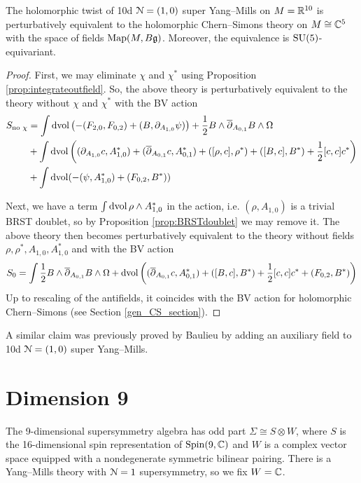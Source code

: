 \documentclass[10pt, oneside]{article}
\begin{document}
\begin{thm}
The holomorphic twist of 10d $\mathcal{N}=(1, 0)$ super Yang--Mills on $M=\mathbb R^{10}$ is perturbatively equivalent to the holomorphic Chern--Simons theory on $M\cong\mathbb C^5$ with the space of fields $\operatorname{Map}(M, B\mathfrak{g})$. Moreover, the equivalence is $\mathrm{SU}(5)$-equivariant.
\label{thm:10dholomorphictwist}
\end{thm}
\begin{proof}
First, we may eliminate $\chi$ and $\chi^*$ using Proposition \ref{prop:integrateoutfield}. So, the above theory is perturbatively equivalent to the theory without $\chi$ and $\chi^*$ with the BV action
\begin{align*}
S_{\text{no }\chi} &= \int \operatorname{dvol} \left(-(F_{2, 0}, F_{0, 2}) + (B, \partial_{A_{1, 0}} \psi)\right)  + \frac{1}{2}B\wedge \overline{\partial}_{A_{0, 1}} B\wedge\Omega \\
&+ \int \operatorname{dvol}\left((\partial_{A_{1, 0}} c, A_{1, 0}^*) + (\overline{\partial}_{A_{0, 1}} c, A_{0, 1}^*) + ([\rho, c], \rho^*) + ([B, c], B^*) + \frac{1}{2}[c, c]c^*\right) \\
&+ \int \operatorname{dvol}(-(\psi, A_{1, 0}^*) + (F_{0, 2}, B^*))
\end{align*}

Next, we have a term $\int \operatorname{dvol} \rho\wedge A_{1, 0}^*$ in the action, i.e. $(\rho, A_{1, 0})$ is a trivial BRST doublet, so by Proposition \ref{prop:BRSTdoublet} we may remove it. The above theory then becomes perturbatively equivalent to the theory without fields $\rho,\rho^*,A_{1,0},A_{1,0}^*$ and with the BV action
\[
S_0 = \int \frac{1}{2}B\wedge \overline{\partial}_{A_{0, 1}} B\wedge\Omega + \operatorname{dvol}\left((\overline{\partial}_{A_{0, 1}} c, A_{0, 1}^*) + ([B, c], B^*) + \frac{1}{2}[c, c]c^* + (F_{0, 2}, B^*)\right)
\]
Up to rescaling of the antifields, it coincides with the BV action for holomorphic Chern--Simons (see Section \ref{gen_CS_section}).
\end{proof}

\begin{remark}
A similar claim was previously proved by Baulieu \cite{Baulieu} by adding an auxiliary field to 10d $\mathcal{N}=(1, 0)$ super Yang--Mills.
\end{remark}

\section{Dimension 9}

The 9-dimensional supersymmetry algebra has odd part $\Sigma\cong S\otimes W$, where $S$ is the 16-dimensional spin representation of $\mathrm{Spin}(9, \mathbb C)$ and $W$ is a complex vector space equipped with a nondegenerate symmetric bilinear pairing. There is a Yang--Mills theory with $\mathcal{N}=1$ supersymmetry, so we fix $W = \mathbb C$.
\end{document}
